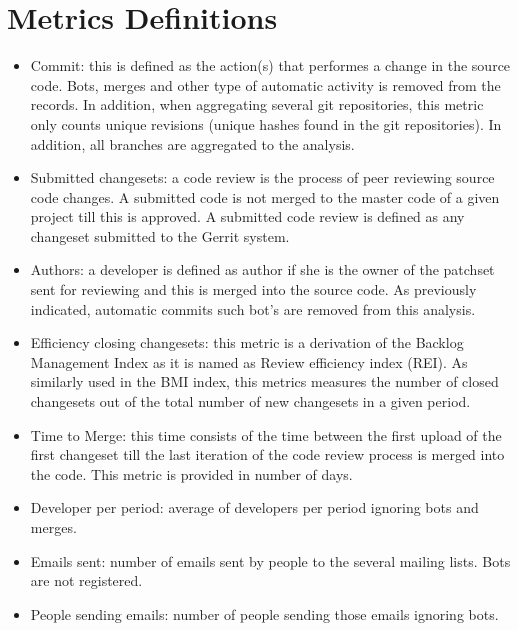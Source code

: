 \documentclass[a4wide,11pt]{article}
\begin{document}


\appendix{}

\section{Metrics Definitions} \label{metrics}
\label{chap:metrics_definitions}

\begin{itemize}
\item Commit: this is defined as the action(s) that performes a change in the source code. Bots, merges and other type of automatic activity is removed from the records. In addition, when aggregating several git repositories, this metric only counts unique revisions (unique hashes found in the git repositories). In addition, all branches are aggregated to the analysis.

\item Submitted changesets: a code review is the process of peer reviewing source code changes. A submitted code is not merged to the master code of a given project till this is approved. A submitted code review is defined as any changeset submitted to the Gerrit
system. 
 
\item Authors: a developer is defined as author if she is the owner of the patchset sent for reviewing and this is merged into the source code. As previously indicated, automatic commits such bot's are removed from this analysis.

\item Efficiency closing changesets: this metric is a derivation of the Backlog Management Index as it is named as Review efficiency index (REI). As similarly used in the BMI index, this metrics measures the number of closed changesets
 out of the total number of new changesets in a given period.

\item Time to Merge: this time consists of the time between the first upload of the first changeset till the last iteration of the code review process is merged into the code. This metric is provided in number of days.

\item Developer per period: average of developers per period ignoring bots and merges.

\item Emails sent: number of emails sent by people to the several mailing lists. Bots are not registered.

\item People sending emails: number of people sending those emails ignoring bots.

\end{itemize}
\end{document}
